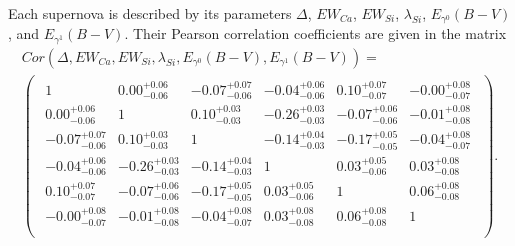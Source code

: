 \documentclass{aastex61}   	%
\begin{document}
%

Each supernova is described by its parameters $\Delta$, $EW_{Ca}$, $EW_{Si}$, $\lambda_{Si}$, $E_{\gamma^0}(B-V)$, and $E_{\gamma^1}(B-V)$.
Their Pearson correlation coefficients  are given in the matrix
\begin{multline}
Cor(\Delta, EW_{Ca}, EW_{Si}, \lambda_{Si}, E_{\gamma^0}(B-V), E_{\gamma^1}(B-V)) =\\
\begin{pmatrix}
\begin{array}{rrrrrr}
1 & 0.00^{+0.06}_{-0.06} & -0.07^{+0.07}_{-0.06} & -0.04^{+0.06}_{-0.06} & 0.10^{+0.07}_{-0.07} & -0.00^{+0.08}_{-0.07} \\
0.00^{+0.06}_{-0.06} & 1 & 0.10^{+0.03}_{-0.03} & -0.26^{+0.03}_{-0.03} & -0.07^{+0.06}_{-0.06} & -0.01^{+0.08}_{-0.08} \\
-0.07^{+0.07}_{-0.06} & 0.10^{+0.03}_{-0.03} & 1 & -0.14^{+0.04}_{-0.03} & -0.17^{+0.05}_{-0.05} & -0.04^{+0.08}_{-0.07} \\
-0.04^{+0.06}_{-0.06} & -0.26^{+0.03}_{-0.03} & -0.14^{+0.04}_{-0.03} & 1 & 0.03^{+0.05}_{-0.06} & 0.03^{+0.08}_{-0.08} \\
0.10^{+0.07}_{-0.07} & -0.07^{+0.06}_{-0.06} & -0.17^{+0.05}_{-0.05} & 0.03^{+0.05}_{-0.06} & 1 & 0.06^{+0.08}_{-0.08} \\
-0.00^{+0.08}_{-0.07} & -0.01^{+0.08}_{-0.08} & -0.04^{+0.08}_{-0.07} & 0.03^{+0.08}_{-0.08} & 0.06^{+0.08}_{-0.08} & 1 \\
\end{array}
\end{pmatrix}.
\end{multline}
\end{document}
